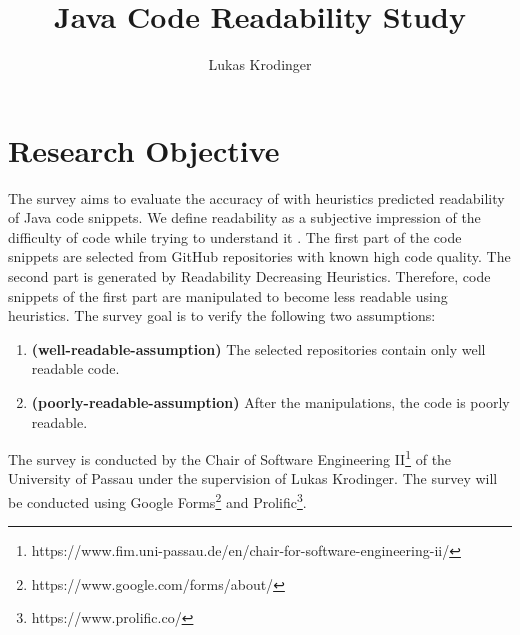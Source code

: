 \documentclass[%
class=scrreprt,
chapterprefix=false,%
open=right,%
twoside=false,%
paper=a4,%
logofile={Logo\_zentral\_farbig\_EN.png},%
thesistype=masterproposal,%
UKenglish,%
]{se2thesis}
\author{Lukas Krodinger}
\title{Java Code Readability Study}
\institute{Chair of Software Engineering II}
\begin{document}
	
	\frontmatter
	
	\maketitle
	
	\mainmatter
	
\section{Research Objective}
The survey aims to evaluate the accuracy of with heuristics predicted readability of Java code snippets. 
We define readability as a subjective impression of the difficulty of code while trying to understand it \cite{posnett2011simpler, buse2009learning}.
The first part of the code snippets are selected from GitHub repositories with known high code quality.
The second part is generated by Readability Decreasing Heuristics. Therefore, code snippets of the first part are manipulated to become less readable using heuristics.
The survey goal is to verify the following two assumptions:
\begin{enumerate}
	\item \label{well-readable-assumption} \textbf{(well-readable-assumption)} The selected repositories contain only well readable code.
	\item \label{poorly-readable-assumption} \textbf{(poorly-readable-assumption)} After the manipulations, the code is poorly readable.
\end{enumerate}

The survey is conducted by the Chair of Software Engineering II\footnote{https://www.fim.uni-passau.de/en/chair-for-software-engineering-ii/} of the University of Passau under the supervision of Lukas Krodinger.
The survey will be conducted using Google Forms\footnote{https://www.google.com/forms/about/} and Prolific\footnote{https://www.prolific.co/}.
\end{document}
